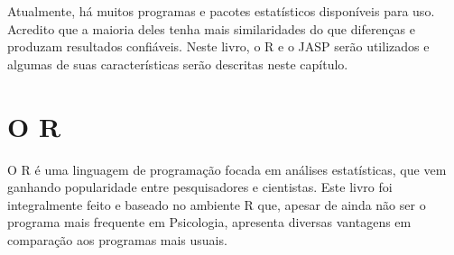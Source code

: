 \documentclass[
]{book}
\begin{document}
Atualmente, há muitos programas e pacotes estatísticos disponíveis para uso. Acredito que a maioria deles tenha mais similaridades do que diferenças e produzam resultados confiáveis. Neste livro, o R e o JASP serão utilizados e algumas de suas características serão descritas neste capítulo.

\hypertarget{o-r}{%
\section{O R}\label{o-r}}

O R é uma linguagem de programação focada em análises estatísticas, que vem ganhando popularidade entre pesquisadores e cientistas. Este livro foi integralmente feito e baseado no ambiente R que, apesar de ainda não ser o programa mais frequente em Psicologia, apresenta diversas vantagens em comparação aos programas mais usuais.
\end{document}
